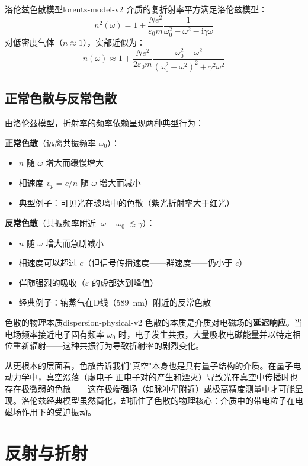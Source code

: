 \documentclass[11pt,a4paper,openany,oneside]{book}
\newcommand{\ii}{\mathrm{i}}
\newcommand{\eps}{\varepsilon}
\begin{document}
\begin{theorem}{洛伦兹色散模型}{lorentz-model-v2}
介质的复折射率平方满足洛伦兹模型：
\[
n^2(\omega) = 1 + \frac{Ne^2}{\eps_0 m}\frac{1}{\omega_0^2 - \omega^2 - \ii\gamma\omega}
\]
对低密度气体（$n \approx 1$），实部近似为：
\[
n(\omega) \approx 1 + \frac{Ne^2}{2\eps_0 m}\frac{\omega_0^2 - \omega^2}{(\omega_0^2 - \omega^2)^2 + \gamma^2\omega^2}
\]
\end{theorem}

\subsection{正常色散与反常色散}

由洛伦兹模型，折射率的频率依赖呈现两种典型行为：

\textbf{正常色散}（远离共振频率 $\omega_0$）：
\begin{itemize}
\item $n$ 随 $\omega$ 增大而缓慢增大
\item 相速度 $v_p = c/n$ 随 $\omega$ 增大而减小
\item 典型例子：可见光在玻璃中的色散（紫光折射率大于红光）
\end{itemize}

\textbf{反常色散}（共振频率附近 $|\omega - \omega_0| \lesssim \gamma$）：
\begin{itemize}
\item $n$ 随 $\omega$ 增大而急剧减小
\item 相速度可以超过 $c$（但信号传播速度——群速度——仍小于 $c$）
\item 伴随强烈的吸收（$\eps$ 的虚部达到峰值）
\item 经典例子：钠蒸气在D线（\SI{589}{\nano\m}）附近的反常色散
\end{itemize}

\begin{insight}{色散的物理本质}{dispersion-physical-v2}
色散的本质是介质对电磁场的\textbf{延迟响应}。当电场频率接近电子固有频率 $\omega_0$ 时，电子发生共振，大量吸收电磁能量并以特定相位重新辐射——这种共振行为导致折射率的剧烈变化。

从更根本的层面看，色散告诉我们"真空"本身也是具有量子结构的介质。在量子电动力学中，真空涨落（虚电子-正电子对的产生和湮灭）导致光在真空中传播时也存在极微弱的色散——这在极端强场（如脉冲星附近）或极高精度测量中才可能显现。洛伦兹经典模型虽然简化，却抓住了色散的物理核心：介质中的带电粒子在电磁场作用下的受迫振动。
\end{insight}

\section{反射与折射}
\end{document}
